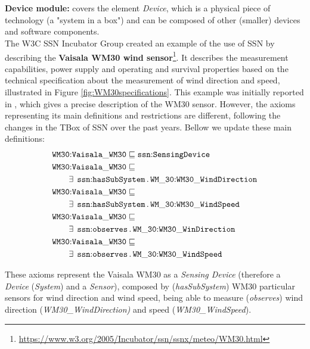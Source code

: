 \documentclass{sig-alternate-05-2015}
\newcommand{\erestr}[2]{\exists\;\,{\tt #1}\,.\,{\tt #2}}
\begin{document}
\\\\\textbf{Device module:} covers the element \textit{Device}, which is a physical piece of technology (a "system in a box") and can be composed of other (smaller) devices and software components.\\
 
The W3C SSN Incubator Group created an example of the use of SSN by describing the \textbf{Vaisala WM30 wind sensor}\footnote{\url{https://www.w3.org/2005/Incubator/ssn/ssnx/meteo/WM30.html}}. It describes the measurement capabilities, power supply and operating and survival properties based on the technical specification about the measurement of wind direction and speed, illustrated in Figure \ref{fig:WM30specifications}. This example was initially reported in \cite{Compton2009}, which gives a precise description of the WM30 sensor. However, the axioms representing its main definitions and restrictions are different, following the changes in the TBox of SSN over the past years. Bellow we update these main definitions:
\begin{align*}
  \begin{aligned}
	&\node{WM30}{Vaisala\-\_WM30} \sqsubseteq \node{ssn}{SensingDevice}\\
	&\node{WM30}{Vaisala\-\_WM30} \sqsubseteq\\
	&\qquad\erestr{\node{ssn}{hasSubSystem}}{\node{WM\_30}{WM30\-\_Wind\-Direction}}\\
	&\node{WM30}{Vaisala\-\_WM30} \sqsubseteq\\
	&\qquad\erestr{\node{ssn}{hasSubSystem}}{\node{WM\_30}{WM30\-\_WindSpeed}}\\	
	&\node{WM30}{Vaisala\-\_WM30} \sqsubseteq\\
	&\qquad\erestr{\node{ssn}{observes}}{\node{WM\_30}{WM30\-\_WinDirection}}\\
	&\node{WM30}{Vaisala\-\_WM30} \sqsubseteq\\
	&\qquad\erestr{\node{ssn}{observes}}{\node{WM\_30}{WM30\-\_WindSpeed}}\\
  \end{aligned}\\
\end{align*}

These axioms represent the Vaisala WM30 as a \textit{Sensing Device} (therefore a \textit{Device} (\textit{System}) and a \textit{Sensor}), composed by (\textit{hasSubSystem}) WM30 particular sensors for wind direction and wind speed, being able to measure (\textit{observes}) wind direction (\textit{WM30\-\_Wind\-Direction)} and speed (\textit{WM30\-\_WindSpeed}). 
\end{document}
